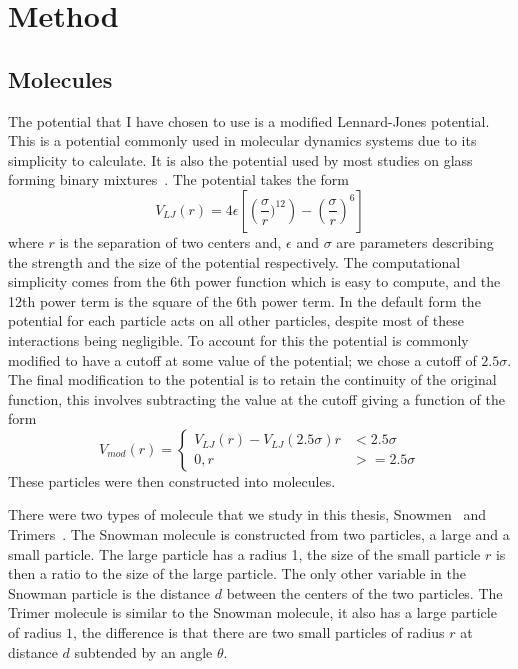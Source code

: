 
\chapter{Method}

\section{Molecules}

The potential that I have chosen to use is a modified Lennard-Jones potential. This is a potential commonly used in molecular dynamics systems due to its simplicity to calculate. It is also the potential used by most studies on glass forming binary mixtures~\tocite. The potential takes the form
\begin{equation}
    V_{LJ}(r) = 4\epsilon\left [ \left (\frac{\sigma}{r})^{12}\right ) -\left ( \frac{\sigma}{r} \right )^6 \right]
\end{equation}
where $r$ is the separation of two centers and, $\epsilon$ and $\sigma$ are parameters describing the strength and the size of the potential respectively. The computational simplicity comes from the 6th power function which is easy to compute, and the 12th power term is the square of the 6th power term. In the default form the potential for each particle acts on all other particles, despite most of these interactions being negligible. To account for this the potential is commonly modified to have a cutoff at some value of the potential; we chose a cutoff of $2.5\sigma$. The final modification to the potential is to retain the continuity of the original function, this involves subtracting the value at the cutoff giving a function of the form
\begin{equation}
    V_{mod}(r) = \begin{cases}
        V_{LJ}(r) - V_{LJ}(2.5\sigma) r &< 2.5\sigma \\
        0,  r &>= 2.5\sigma
    \end{cases}
\end{equation}
These particles were then constructed into molecules.

There were two types of molecule that we study in this thesis, Snowmen~ and Trimers~. The Snowman molecule is constructed from two particles, a large and a small particle. The large particle has a radius 1, the size of the small particle $r$ is then a ratio to the size of the large particle. The only other variable in the Snowman particle is the distance $d$ between the centers of the two particles. The Trimer molecule is similar to the Snowman molecule, it also has a large particle of radius $1$, the difference is that there are two small particles of radius $r$ at distance $d$ subtended by an angle $\theta$.

